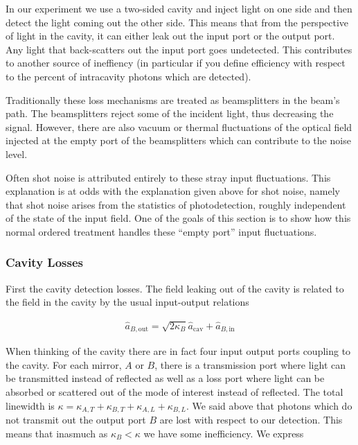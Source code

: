 \documentclass[12pt]{article}
\begin{document}
In our experiment we use a two-sided cavity and inject light on one side and then detect the light coming out the other side. This means that from the perspective of light in the cavity, it can either leak out the input port or the output port. Any light that back-scatters out the input port goes undetected. This contributes to another source of ineffiency (in particular if you define efficiency with respect to the percent of intracavity photons which are detected).

Traditionally these loss mechanisms are treated as beamsplitters in the beam's path. The beamsplitters reject some of the incident light, thus decreasing the signal. However, there are also vacuum or thermal fluctuations of the optical field injected at the empty port of the beamsplitters which can contribute to the noise level.

Often shot noise is attributed entirely to these stray input fluctuations. This explanation is at odds with the explanation given above for shot noise, namely that shot noise arises from the statistics of photodetection, roughly independent of the state of the input field. One of the goals of this section is to show how this normal ordered treatment handles these ``empty port'' input fluctuations.

\subsubsection{Cavity Losses}
First the cavity detection losses. The field leaking out of the cavity is related to the field in the cavity by the usual input-output relations \cite{Gardiner1985}

\begin{align}
\hat{a}_{B,\text{out}} = \sqrt{2\kappa_B} \hat{a}_{\text{cav}} + \hat{a}_{B,\text{in}}
\end{align}

When thinking of the cavity there are in fact four input output ports coupling to the cavity. For each mirror, $A$ or $B$, there is a transmission port where light can be transmitted instead of reflected as well as a loss port where light can be absorbed or scattered out of the mode of interest instead of reflected.
The total linewidth is $\kappa = \kappa_{A,T} + \kappa_{B,T} + \kappa_{A,L} + \kappa_{B,L}$.
 We said above that photons which do not transmit out the output port $B$ are lost with respect to our detection. This means that inasmuch as $\kappa_B < \kappa$ we have some inefficiency. We express
\end{document}
